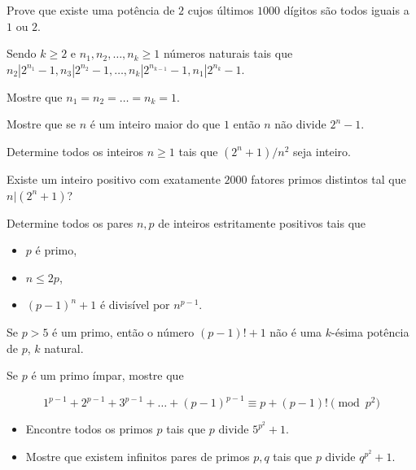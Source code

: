 \begin{questao}
  Prove que existe uma potência de $2$ cujos últimos
  $1000$ dígitos são todos iguais a $1$ ou $2$.
\end{questao}

\begin{questao}
  Sendo $k \geq 2$ e $n_1,n_2,\ldots,n_k \geq 1$ números naturais tais que
  $n_2|2^{n_1}-1, n_3|2^{n_2}-1, \ldots, n_k|2^{n_{k-1}}-1, n_1|2^{n_k}-1$.

  Mostre que $n_1 = n_2 = \ldots = n_k = 1$.
\end{questao}

\begin{questao}
  Mostre que se $n$ é um inteiro maior do que $1$ então
  $n$ não divide $2^n-1$.
\end{questao}

\begin{questao}
  Determine todos os inteiros $n \geq 1$ tais que
  $(2^n+1)/n^2$ seja inteiro.
\end{questao}

\begin{questao}
  Existe um inteiro positivo com exatamente $2000$ fatores
  primos distintos tal que $n|(2^n+1)$?
\end{questao}

\begin{questao}
  Determine todos os pares $n,p$ de inteiros estritamente
  positivos tais que
  \begin{itemize}
    \item $p$ é primo,

    \item $n \leq 2p$,

    \item $(p-1)^n+1$ é divisível por $n^{p-1}$.
  \end{itemize}
\end{questao}

\begin{questao}
  Se $p>5$ é um primo, então o número $(p-1)!+1$ não é
  uma $k$-ésima potência de $p$, $k$ natural.
\end{questao}

\begin{questao}
  Se $p$ é um primo ímpar, mostre que

  $$ 1^{p-1} + 2^{p-1} + 3^{p-1} + \ldots + (p-1)^{p-1} \equiv
  p+(p-1)! \pmod{p^2} $$
\end{questao}

\begin{questao}
  \begin{itemize}
    \item Encontre todos os primos $p$ tais que $p$ divide
    $5^{p^2}+1$.

    \item Mostre que existem infinitos pares de primos $p,q$ tais
    que $p$ divide $q^{p^2}+1$.
  \end{itemize}
\end{questao}

